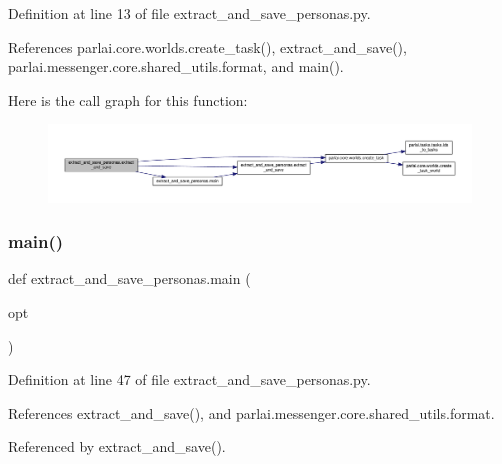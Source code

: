 Definition at line 13 of file extract\+\_\+and\+\_\+save\+\_\+personas.\+py.



References parlai.\+core.\+worlds.\+create\+\_\+task(), extract\+\_\+and\+\_\+save(), parlai.\+messenger.\+core.\+shared\+\_\+utils.\+format, and main().

Here is the call graph for this function\+:
\nopagebreak
\begin{figure}[H]
\begin{center}
\leavevmode
\includegraphics[width=350pt]{namespaceextract__and__save__personas_af6196a0605098280a6766f0f9a99e4b5_cgraph}
\end{center}
\end{figure}
\mbox{\label{namespaceextract__and__save__personas_abb9b78f74e9baf9fa763bff3c1b99381}} 
\subsubsection{\texorpdfstring{main()}{main()}}
{\footnotesize\ttfamily def extract\+\_\+and\+\_\+save\+\_\+personas.\+main (\begin{DoxyParamCaption}\item[{}]{opt }\end{DoxyParamCaption})}



Definition at line 47 of file extract\+\_\+and\+\_\+save\+\_\+personas.\+py.



References extract\+\_\+and\+\_\+save(), and parlai.\+messenger.\+core.\+shared\+\_\+utils.\+format.



Referenced by extract\+\_\+and\+\_\+save().


